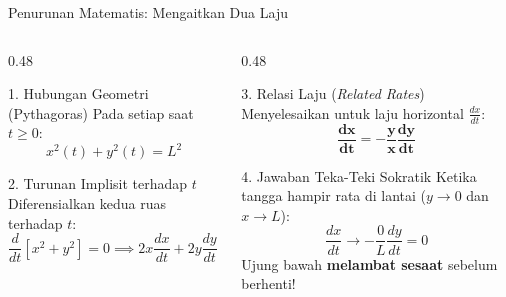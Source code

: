\documentclass[aspectratio=169,10pt]{beamer}
\begin{document}
\begin{frame}{Penurunan Matematis: Mengaitkan Dua Laju}
    \begin{columns}[T]
        \begin{column}{0.48\textwidth}
            \begin{block}{1. Hubungan Geometri (Pythagoras)}
                Pada setiap saat $t \ge 0$:
                \[
                    x^2(t) + y^2(t) = L^2
                \]
            \end{block}

            \begin{block}{2. Turunan Implisit terhadap $t$}
                Diferensialkan kedua ruas terhadap $t$:
                \[
                    \frac{d}{dt}[x^2 + y^2] = 0 \implies 2x \frac{dx}{dt} + 2y \frac{dy}{dt} = 0
                \]
            \end{block}
        \end{column}

        \begin{column}{0.48\textwidth}
            \begin{exampleblock}{3. Relasi Laju (\textit{Related Rates})}
                Menyelesaikan untuk laju horizontal $\frac{dx}{dt}$:
                \[
                    \mathbf{\frac{dx}{dt} = -\frac{y}{x} \frac{dy}{dt}}
                \]
            \end{exampleblock}

            \begin{alertblock}{4. Jawaban Teka-Teki Sokratik}
                Ketika tangga hampir rata di lantai ($y \to 0$ dan $x \to L$):
                \[
                    \frac{dx}{dt} \to -\frac{0}{L}\frac{dy}{dt} = 0
                \]
                Ujung bawah \textbf{melambat sesaat} sebelum berhenti!
            \end{alertblock}
        \end{column}
    \end{columns}
\end{frame}
\end{document}
